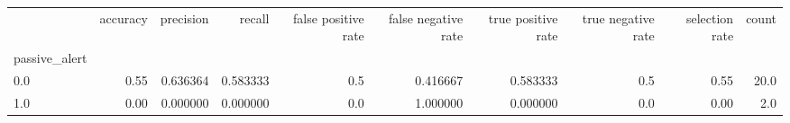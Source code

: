 \begin{tabular}{lrrrrrrrrr}
\toprule
{} &  accuracy &  precision &    recall &  false positive rate &  false negative rate &  true positive rate &  true negative rate &  selection rate &  count \\
passive\_alert &           &            &           &                      &                      &                     &                     &                 &        \\
\midrule
0.0           &      0.55 &   0.636364 &  0.583333 &                  0.5 &             0.416667 &            0.583333 &                 0.5 &            0.55 &   20.0 \\
1.0           &      0.00 &   0.000000 &  0.000000 &                  0.0 &             1.000000 &            0.000000 &                 0.0 &            0.00 &    2.0 \\
\bottomrule
\end{tabular}
